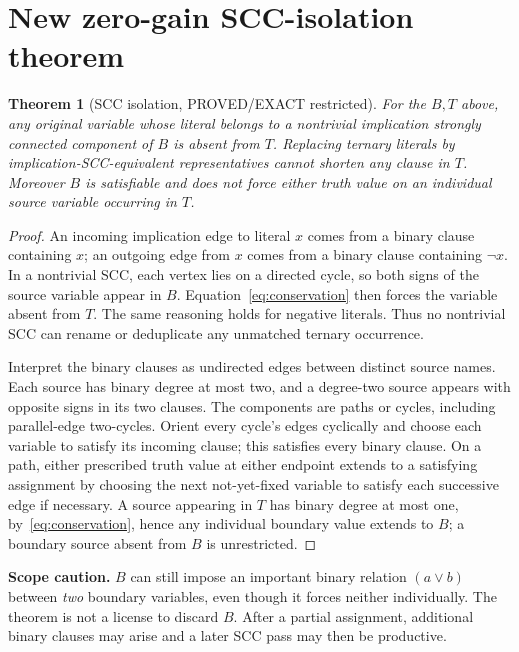 \documentclass[11pt]{article}
\newtheorem{theorem}{Theorem}
\begin{document}
\section{New zero-gain SCC-isolation theorem}
\begin{theorem}[SCC isolation, PROVED/EXACT restricted]\label{th:scc}
For the $B,T$ above, any original variable whose literal belongs to a nontrivial implication strongly connected component of $B$ is absent from $T$. Replacing ternary literals by implication-SCC-equivalent representatives cannot shorten any clause in $T$. Moreover $B$ is satisfiable and does not force either truth value on an individual source variable occurring in $T$.
\end{theorem}
\begin{proof}
An incoming implication edge to literal $x$ comes from a binary clause containing $x$; an outgoing edge from $x$ comes from a binary clause containing $\neg x$. In a nontrivial SCC, each vertex lies on a directed cycle, so both signs of the source variable appear in $B$. Equation~\eqref{eq:conservation} then forces the variable absent from $T$. The same reasoning holds for negative literals. Thus no nontrivial SCC can rename or deduplicate any unmatched ternary occurrence.

Interpret the binary clauses as undirected edges between distinct source names. Each source has binary degree at most two, and a degree-two source appears with opposite signs in its two clauses. The components are paths or cycles, including parallel-edge two-cycles. Orient every cycle's edges cyclically and choose each variable to satisfy its incoming clause; this satisfies every binary clause. On a path, either prescribed truth value at either endpoint extends to a satisfying assignment by choosing the next not-yet-fixed variable to satisfy each successive edge if necessary. A source appearing in $T$ has binary degree at most one, by~\eqref{eq:conservation}, hence any individual boundary value extends to $B$; a boundary source absent from $B$ is unrestricted. 
\end{proof}
\textbf{Scope caution.} $B$ can still impose an important binary relation $(a\lor b)$ between \emph{two} boundary variables, even though it forces neither individually. The theorem is not a license to discard $B$. After a partial assignment, additional binary clauses may arise and a later SCC pass may then be productive.
\end{document}
